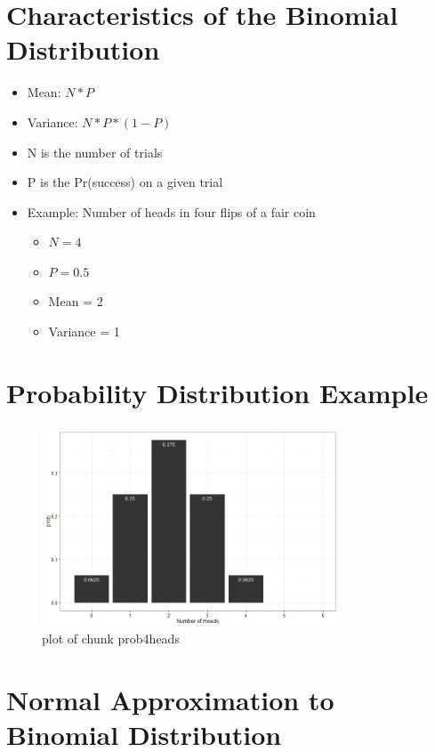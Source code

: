 \documentclass[12pt]{article}
\begin{document}
\section{Characteristics of the Binomial
Distribution}\label{characteristics-of-the-binomial-distribution}

\begin{itemize}
\item
  Mean: \(N * P\)
\item
  Variance: \(N * P * (1 - P)\)
\item
  N is the number of trials
\item
  P is the Pr(success) on a given trial
\item
  Example: Number of heads in four flips of a fair coin

  \begin{itemize}
  \itemsep1pt\parskip0pt
  \item
    \(N = 4\)
  \item
    \(P = 0.5\)
  \item
    Mean = 2
  \item
    Variance = 1
  \end{itemize}
\end{itemize}

\section{Probability Distribution
Example}\label{probability-distribution-example}

\begin{figure}[H]
\centering
\includegraphics[width=3.5in]{figure/prob4heads-1.png}
\caption{plot of chunk prob4heads}
\end{figure}

\section{Normal Approximation to Binomial
Distribution}\label{normal-approximation-to-binomial-distribution}
\end{document}
